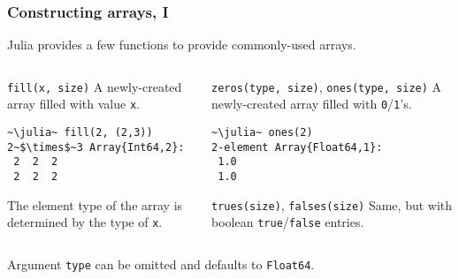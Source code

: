 \documentclass[english,serif,mathserif,xcolor=pdftex,dvipsnames,table]{beamer}
\begin{document}
\begin{frame}[fragile]
  \frametitle{Constructing arrays, I}
    \small
  Julia provides a few functions to provide commonly-used arrays.
  \begin{columns}
    \begin{column}{0.5\textwidth}
      \raggedright

      \begin{describe}{\texttt{fill(x, size)}}
        A newly-created array filled with value \texttt{x}.
\begin{lstlisting}
~\julia~ fill(2, (2,3))
2~$\times$~3 Array{Int64,2}:
 2  2  2
 2  2  2
\end{lstlisting}
        The element type of the array is determined by the type
        of \texttt{x}.
      \end{describe}

    \end{column}
    \begin{column}{0.5\textwidth}
      \raggedright

      \begin{describe}{\texttt{zeros(type, size)}, \texttt{ones(type, size)}}
        A newly-created array filled with \texttt{0}/\texttt{1}'s.
\begin{lstlisting}
~\julia~ ones(2)
2-element Array{Float64,1}:
 1.0
 1.0
\end{lstlisting}
      \end{describe}

      \begin{describe}{\texttt{\texttt{trues(size)}}, \texttt{falses(size)}}
        Same, but with boolean \texttt{true}/\texttt{false} entries.
      \end{describe}
    \end{column}
  \end{columns}

  \+
  Argument \texttt{type} can be omitted and defaults to \texttt{Float64}.
\end{frame}
\end{document}
